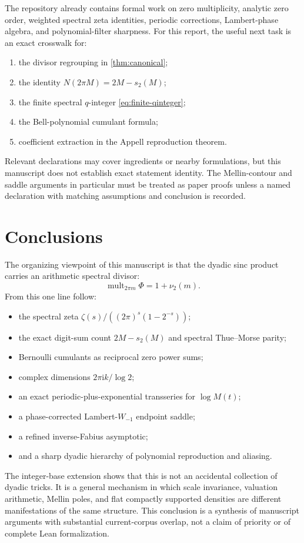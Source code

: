 \documentclass[11pt,oneside]{article}
\theoremstyle{definition}
\theoremstyle{remark}
\newcommand{\ii}{\mathrm i}
\begin{document}
The repository already contains formal work on zero multiplicity, analytic
zero order, weighted spectral zeta identities, periodic corrections,
Lambert-phase algebra, and polynomial-filter sharpness.  For this report, the
useful next task is an exact crosswalk for:
\begin{enumerate}[label=(\roman*),leftmargin=2.5em]
\item the divisor regrouping in \cref{thm:canonical};
\item the identity \(N(2\pi M)=2M-s_2(M)\);
\item the finite spectral \(q\)-integer \eqref{eq:finite-qinteger};
\item the Bell-polynomial cumulant formula;
\item coefficient extraction in the Appell reproduction theorem.
\end{enumerate}
Relevant declarations may cover ingredients or nearby formulations, but this
manuscript does not establish exact statement identity.  The Mellin-contour
and saddle arguments in particular must be treated as paper proofs unless a
named declaration with matching assumptions and conclusion is recorded.

\section{Conclusions}

The organizing viewpoint of this manuscript is that the dyadic sinc product
carries an arithmetic spectral divisor:
\[
 \operatorname{mult}_{2\pi m}\Phi=1+\nu_2(m).
\]
From this one line follow:
\begin{itemize}[leftmargin=2em]
\item the spectral zeta
      \(\zeta(s)/((2\pi)^s(1-2^{-s}))\);
\item the exact digit-sum count \(2M-s_2(M)\) and spectral Thue--Morse parity;
\item Bernoulli cumulants as reciprocal zero power sums;
\item complex dimensions \(2\pi\ii k/\log2\);
\item an exact periodic-plus-exponential transseries for \(\log M(t)\);
\item a phase-corrected Lambert-\(W_{-1}\) endpoint saddle;
\item a refined inverse-Fabius asymptotic;
\item and a sharp dyadic hierarchy of polynomial reproduction and aliasing.
\end{itemize}
The integer-base extension shows that this is not an accidental collection of
dyadic tricks.  It is a general mechanism in which scale invariance,
valuation arithmetic, Mellin poles, and flat compactly supported densities
are different manifestations of the same structure.  This conclusion is a
synthesis of manuscript arguments with substantial current-corpus overlap,
not a claim of priority or of complete Lean formalization.
\end{document}
